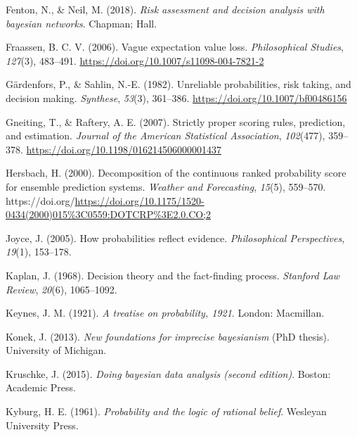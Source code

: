 \documentclass[
  letterpaper,
  DIV=11,
  numbers=noendperiod]{scrartcl}
\newlength{\cslhangindent}
\newlength{\cslentryspacingunit} %
\newenvironment{CSLReferences}[2] %
 {%
  \setlength{\parindent}{0pt}
  \ifodd #1
  \let\oldpar\par
  \def\par{\hangindent=\cslhangindent\oldpar}
  \fi
  \setlength{\parskip}{#2\cslentryspacingunit}
 }%
 {}
\begin{document}
\begin{CSLReferences}{1}{0}
\leavevmode{}%
Fenton, N., \& Neil, M. (2018). \emph{Risk assessment and decision
analysis with bayesian networks}. Chapman; Hall.

\leavevmode{}%
Fraassen, B. C. V. (2006). Vague expectation value loss.
\emph{Philosophical Studies}, \emph{127}(3), 483--491.
\url{https://doi.org/10.1007/s11098-004-7821-2}

\leavevmode{}%
Gärdenfors, P., \& Sahlin, N.-E. (1982). Unreliable probabilities, risk
taking, and decision making. \emph{Synthese}, \emph{53}(3), 361--386.
\url{https://doi.org/10.1007/bf00486156}

\leavevmode{}%
Gneiting, T., \& Raftery, A. E. (2007). Strictly proper scoring rules,
prediction, and estimation. \emph{Journal of the American Statistical
Association}, \emph{102}(477), 359--378.
\url{https://doi.org/10.1198/016214506000001437}

\leavevmode{}%
Hersbach, H. (2000). Decomposition of the continuous ranked probability
score for ensemble prediction systems. \emph{Weather and Forecasting},
\emph{15}(5), 559--570.
https://doi.org/\url{https://doi.org/10.1175/1520-0434(2000)015\%3C0559:DOTCRP\%3E2.0.CO;2}

\leavevmode{}%
Joyce, J. (2005). How probabilities reflect evidence.
\emph{Philosophical Perspectives}, \emph{19}(1), 153--178.

\leavevmode{}%
Kaplan, J. (1968). Decision theory and the fact-finding process.
\emph{Stanford Law Review}, \emph{20}(6), 1065--1092.

\leavevmode{}%
Keynes, J. M. (1921). \emph{A treatise on probability, 1921}. London:
Macmillan.

\leavevmode{}%
Konek, J. (2013). \emph{New foundations for imprecise bayesianism} (PhD
thesis). University of Michigan.

\leavevmode{}%
Kruschke, J. (2015). \emph{Doing bayesian data analysis (second
edition)}. Boston: Academic Press.

\leavevmode{}%
Kyburg, H. E. (1961). \emph{Probability and the logic of rational
belief}. Wesleyan University Press.


\end{CSLReferences}
\end{document}
